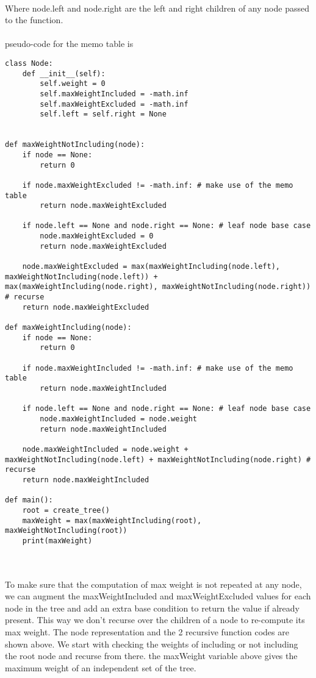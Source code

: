 \documentclass[12pt]{article}
\begin{document}
\\
Where node.left and node.right are the left and right children of any node passed to the function.
\\~\\
pseudo-code for the memo table is 
\begin{verbatim}
class Node:
    def __init__(self):
        self.weight = 0
        self.maxWeightIncluded = -math.inf
        self.maxWeightExcluded = -math.inf
        self.left = self.right = None


def maxWeightNotIncluding(node):
    if node == None:
        return 0
    
    if node.maxWeightExcluded != -math.inf: # make use of the memo table
        return node.maxWeightExcluded
    
    if node.left == None and node.right == None: # leaf node base case
        node.maxWeightExcluded = 0
        return node.maxWeightExcluded
    
    node.maxWeightExcluded = max(maxWeightIncluding(node.left), maxWeightNotIncluding(node.left)) + max(maxWeightIncluding(node.right), maxWeightNotIncluding(node.right)) # recurse
    return node.maxWeightExcluded

def maxWeightIncluding(node):
    if node == None:
        return 0
    
    if node.maxWeightIncluded != -math.inf: # make use of the memo table
        return node.maxWeightIncluded
    
    if node.left == None and node.right == None: # leaf node base case
        node.maxWeightIncluded = node.weight
        return node.maxWeightIncluded
    
    node.maxWeightIncluded = node.weight + maxWeightNotIncluding(node.left) + maxWeightNotIncluding(node.right) # recurse
    return node.maxWeightIncluded

def main():
    root = create_tree()
    maxWeight = max(maxWeightIncluding(root), maxWeightNotIncluding(root))
    print(maxWeight)
\end{verbatim}
\\~\\ To make sure that the computation of max weight is not repeated at any node, we can augment the maxWeightIncluded and maxWeightExcluded values for each node in the tree and add an extra base condition to return the value if already present. This way we don't recurse over the children of a node to re-compute its max weight. The node representation and the 2 recursive function codes are shown above. We start with checking the weights of including or not including the root node and recurse from there. the maxWeight variable above gives the maximum weight of an independent set of the tree. 
\end{document}
